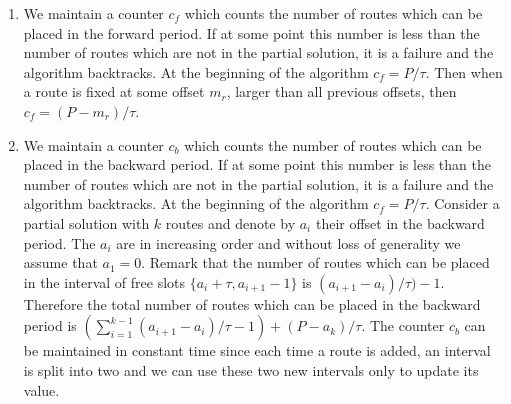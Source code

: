 \documentclass[a4paper,10pt]{article}
\begin{document}
      \begin{enumerate}
       \item We maintain a counter $c_f$ which counts the number of routes which can be placed in the forward
       period. If at some point this number is less than the number of routes which are not in the partial solution,
       it is a failure and the algorithm backtracks. At the beginning of the algorithm $c_f = P / \tau$.
       Then when a route is fixed at some offset $m_r$, larger than all previous offsets, then $c_f = (P - m_r) / \tau $. 
       
       
       \item We maintain a counter $c_b$ which counts the number of routes which can be placed in the backward
       period. If at some point this number is less than the number of routes which are not in the partial solution,
       it is a failure and the algorithm backtracks. At the beginning of the algorithm $c_f = P / \tau$.
       Consider a partial solution with $k$ routes and denote by $a_i$ their offset in the backward period.
       The $a_i$ are in increasing order and without loss of generality we assume that $a_1 = 0$. Remark that the number of routes which can be placed in the interval of free slots $\{a_i+\tau, a_{i+1}-1\}$
       is $(a_{i+1} -a_i) / \tau) -1 $. Therefore the total number of routes which can be placed in the backward period is $\displaystyle{\left( \sum_{i=1}^{k-1} (a_{i+1} -a_i)/\tau - 1 \right)} + (P - a_k) / \tau $.
       The counter $c_b$ can be maintained in constant time since each time a route is added, an interval is split into two and we can 
       use these two new intervals only to update its value.
       

\end{enumerate}
\end{document}
